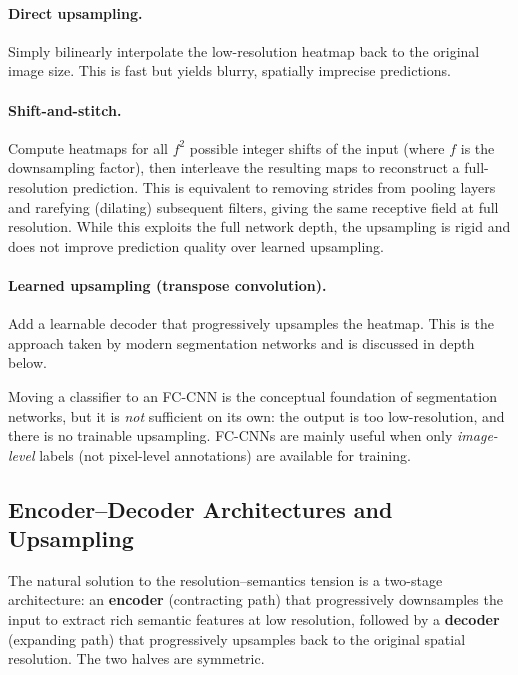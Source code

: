 \documentclass[11pt,a4paper]{article}
\newcommand{\term}[1]{\textcolor{DefGreen}{\textbf{#1}}\index{#1}}
\begin{document}
\paragraph{Direct upsampling.} Simply bilinearly interpolate the low-resolution heatmap back to the original image size. This is fast but yields blurry, spatially imprecise predictions.

\paragraph{Shift-and-stitch.} Compute heatmaps for all $f^2$ possible integer shifts of the input (where $f$ is the downsampling factor), then interleave the resulting maps to reconstruct a full-resolution prediction. This is equivalent to removing strides from pooling layers and rarefying (dilating) subsequent filters, giving the same receptive field at full resolution. While this exploits the full network depth, the upsampling is rigid and does not improve prediction quality over learned upsampling.

\paragraph{Learned upsampling (transpose convolution).} Add a learnable decoder that progressively upsamples the heatmap. This is the approach taken by modern segmentation networks and is discussed in depth below.

\begin{warnbox}
Moving a classifier to an FC-CNN is the conceptual foundation of segmentation networks, but it is \emph{not} sufficient on its own: the output is too low-resolution, and there is no trainable upsampling. FC-CNNs are mainly useful when only \emph{image-level} labels (not pixel-level annotations) are available for training.
\end{warnbox}

\subsection{Encoder--Decoder Architectures and Upsampling}
\label{sec:enc_dec}

The natural solution to the resolution--semantics tension is a two-stage architecture: an \term{encoder} (contracting path) that progressively downsamples the input to extract rich semantic features at low resolution, followed by a \term{decoder} (expanding path) that progressively upsamples back to the original spatial resolution. The two halves are symmetric.
\end{document}
